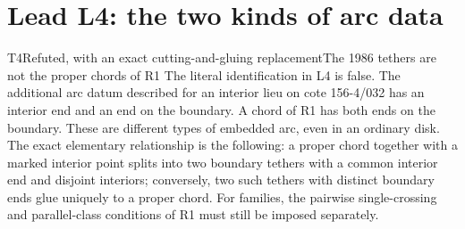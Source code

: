 \section{Lead L4: the two kinds of arc data}

\begin{resultenv}{T4}{Refuted, with an exact cutting-and-gluing replacement}{The 1986 tethers are not the proper chords of R1}
The literal identification in L4 is false. The additional arc datum
described for an interior lieu on cote 156-4/032 has an interior end
and an end on the boundary. A chord of R1 has both ends on the boundary.
These are different types of embedded arc, even in an ordinary disk.
The exact elementary relationship is the following: a proper chord
together with a marked interior point splits into two boundary tethers
with a common interior end and disjoint interiors; conversely, two
such tethers with distinct boundary ends glue uniquely to a proper
chord. For families, the pairwise single-crossing and parallel-class
conditions of R1 must still be imposed separately.
\end{resultenv}
